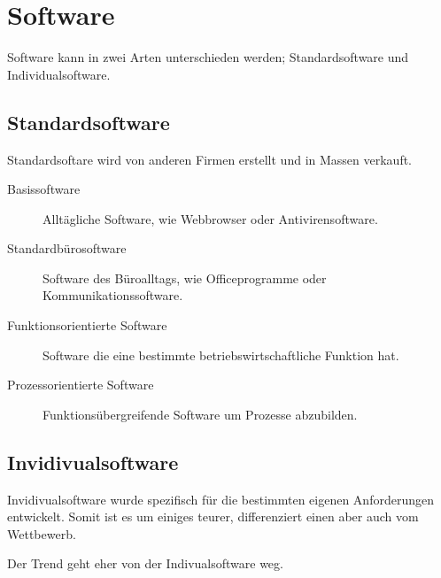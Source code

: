 \documentclass{article}
\begin{document}
\section{Software} 
Software kann in zwei Arten unterschieden werden; Standardsoftware und Individualsoftware. 

\subsection{Standardsoftware}
Standardsoftare wird von anderen Firmen erstellt und in Massen verkauft. 
\begin{description}
 \item[Basissoftware] Alltägliche Software, wie Webbrowser oder Antivirensoftware.
 \item[Standardbürosoftware] Software des Büroalltags, wie Officeprogramme oder Kommunikationssoftware.
 \item[Funktionsorientierte Software] Software die eine bestimmte betriebswirtschaftliche Funktion hat.
 \item[Prozessorientierte Software] Funktionsübergreifende Software um Prozesse abzubilden.
\end{description}
\subsection{Invidivualsoftware}
Invidivualsoftware wurde spezifisch für die bestimmten eigenen Anforderungen entwickelt. Somit ist es um einiges teurer, differenziert einen aber auch vom Wettbewerb.

Der Trend geht eher von der Indivualsoftware weg.
\end{document}
